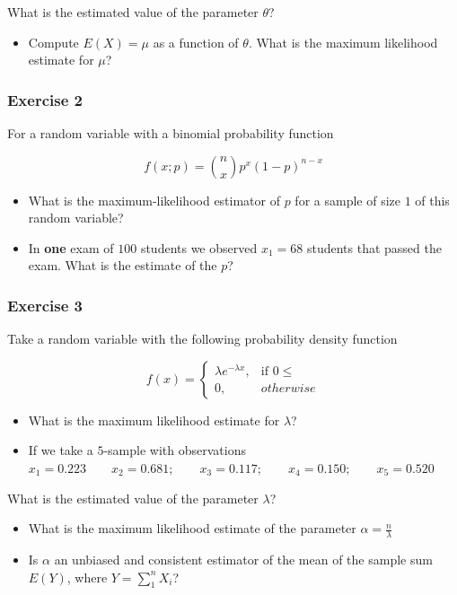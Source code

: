 \documentclass[
]{book}
\providecommand{\tightlist}{%
  \setlength{\itemsep}{0pt}\setlength{\parskip}{0pt}}
\begin{document}
What is the estimated value of the parameter \(\theta\)?

\begin{itemize}
\tightlist
\item
  Compute \(E(X)=\mu\) as a function of \(\theta\). What is the maximum likelihood estimate for \(\mu\)?
\end{itemize}

\hypertarget{exercise-2-9}{%
\subsubsection{Exercise 2}\label{exercise-2-9}}

For a random variable with a binomial probability function

\[f(x; p)=\binom n x p^x(1-p)^{n-x}\]

\begin{itemize}
\item
  What is the maximum-likelihood estimator of \(p\) for a sample of size \(1\) of this random variable?
\item
  In \textbf{one} exam of \(100\) students we observed \(x_1=68\) students that passed the exam. What is the estimate of the \(p\)?
\end{itemize}

\hypertarget{exercise-3-6}{%
\subsubsection{Exercise 3}\label{exercise-3-6}}

Take a random variable with the following probability density function

\[
    f(x)= 
\begin{cases}
    \lambda e^{-\lambda x},& \text{if } 0 \leq\\
    0,& otherwise 
\end{cases}
\]

\begin{itemize}
\item
  What is the maximum likelihood estimate for \(\lambda\)?
\item
  If we take a \(5\)-sample with observations
  \(x_1 = 0.223 \qquad x_2 = 0.681; \qquad x_3 = 0.117; \qquad x_4 = 0.150; \qquad x_5 = 0.520\)
\end{itemize}

What is the estimated value of the parameter \(\lambda\)?

\begin{itemize}
\item
  What is the maximum likelihood estimate of the parameter \(\alpha=\frac{n}{\lambda}\)
\item
  Is \(\alpha\) an unbiased and consistent estimator of the mean of the sample sum \(E(Y)\), where \(Y=\sum_1^n X_i\)?
\end{itemize}
\end{document}
